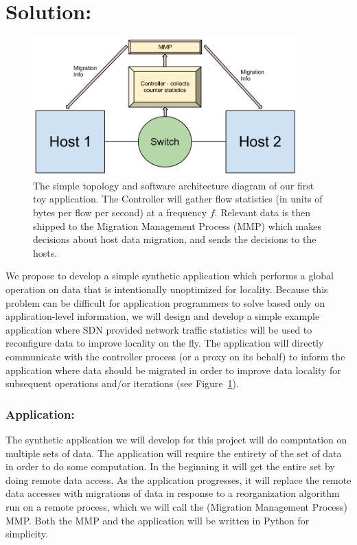 \documentclass[12pt]{article}
\begin{document}
\section*{Solution:}
\label{solution}
\begin{figure}[t]
\centerline{\includegraphics[width=4.0in]{img/toy_arch.png}}
\caption{The simple topology and software architecture diagram of our first toy application.  The Controller 
will gather flow statistics (in units of bytes per flow per second) at a frequency $f$. Relevant data is then
shipped to the Migration Management Process (MMP) which makes decisions about host data migration, and sends the
decisions to the hosts.}
\label{fig:toy_arch}
\end{figure}
We propose to develop a simple synthetic application which performs a global operation on data
that is intentionally unoptimized for locality.  Because this problem can be difficult for application
programmers to solve based only on application-level information, we will design and develop a simple
example application where SDN provided network traffic statistics will be used to reconfigure data to improve locality on the
fly.  The application will directly communicate with the controller process (or a proxy on its behalf)
to inform the application where data should be migrated in order to improve data locality for subsequent
operations and/or iterations (see Figure~\ref{fig:toy_arch}).

\subsubsection*{Application:}
\label{application}
The synthetic application we will develop for this project will do computation on multiple sets of data.
The application will require the entirety of the set of data in order to do some computation.  In the 
beginning it will get the entire set by doing remote data access.  As the application progresses,
it will replace the remote data accesses with migrations of data in response to a reorganization algorithm
run on a remote process, which we will call the (Migration Management Process) MMP.  Both the MMP and the 
application will be written in Python for simplicity.
\end{document}
